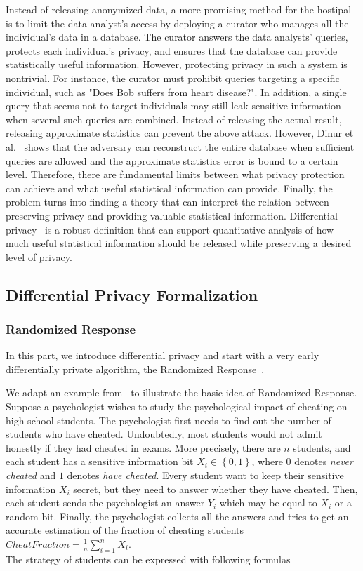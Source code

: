 Instead of releasing anonymized data, a more promising method for the hostipal is to limit the data analyst's access by deploying a curator who manages all the individual's data in a database. The curator answers the data analysts' queries, protects each individual's privacy, and ensures that the database can provide statistically useful information. However, protecting privacy in such a system is nontrivial. For instance, the curator must prohibit queries targeting a specific individual, such as "Does Bob suffers from heart disease?". In addition, a single query that seems not to target individuals may still leak sensitive information when several such queries are combined. Instead of releasing the actual result, releasing approximate statistics can prevent the above attack. However, Dinur et al.~\cite{dinur2003revealing} shows that the adversary can reconstruct the entire database when sufficient queries are allowed and the approximate statistics error is bound to a certain level. Therefore, there are fundamental limits between what privacy protection can achieve and what useful statistical information can provide.
Finally, the problem turns into finding a theory that can interpret the relation between preserving privacy and providing valuable statistical information. Differential privacy~\cite{dwork2006differential} is a robust definition that can support quantitative analysis of how much useful statistical information should be released while preserving a desired level of privacy.


\subsection{Differential Privacy Formalization}

\subsubsection{Randomized Response}
\label{subsubsection:randomizedresponse}
In this part, we introduce differential privacy and start with a very early differentially private algorithm, the Randomized Response~\cite{dinur2003revealing}.

We adapt an example from~\cite{KamathLec3AlgorithmsrivateDataAnalysis} to illustrate the basic idea of Randomized Response.
Suppose a psychologist wishes to study the psychological impact of cheating on high school students. The psychologist first needs to find out the number of students who have cheated. Undoubtedly, most students would not admit honestly if they had cheated in exams. More precisely, there are $n$ students, and each student has a sensitive information bit $X_{i}\in \left\{ 0,1\right\} $, where $0$ denotes \emph{never cheated} and $1$ denotes \emph{have cheated}. Every student want to keep their sensitive information $X_{i}$ secret, but they need to answer whether they have cheated. Then, each student sends the psychologist an answer $Y_{i}$ which may be equal to $X_{i}$ or a random bit. Finally, the psychologist collects all the answers and tries to get an accurate estimation of the fraction of cheating students $CheatFraction=\frac{1}{n}\sum ^{n}_{i=1}X_{i}$. \\
The strategy of students can be expressed with following formulas

